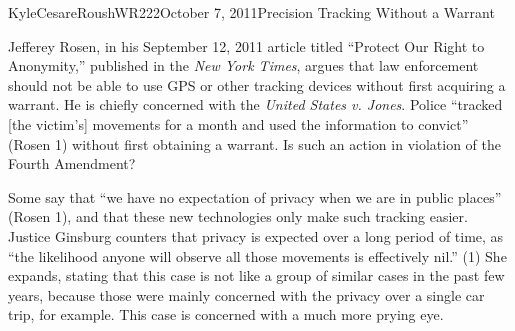 \documentclass[12pt,letterpaper]{article}
\begin{document}
\begin{mla}{Kyle}{Cesare}{Roush}{WR222}{October 7, 2011}{Precision Tracking
Without a Warrant}

Jefferey Rosen, in his September 12, 2011 article titled ``Protect Our Right to
Anonymity,'' published in the \emph{New York Times}, argues that law enforcement
should not be able to use GPS or other tracking devices without first acquiring
a warrant.  He is chiefly concerned with the \emph{United States v. Jones}.
Police ``tracked [the victim's] movements for a month and used the
information to convict'' (Rosen 1) without first obtaining a warrant.  Is such
an action in violation of the Fourth Amendment?

Some say that ``we have no expectation of privacy when we are in public places''
(Rosen 1), and that these new technologies only make such tracking easier.
Justice Ginsburg counters that privacy is expected over a long period of time,
as ``the likelihood anyone will observe all those movements is effectively
nil.'' (1)  She expands, stating that this case is not like a group of similar
cases in the past few years, because those were mainly concerned with the
privacy over a single car trip, for example.  This case is concerned with a much
more prying eye.

% 


\end{mla}
\end{document}
